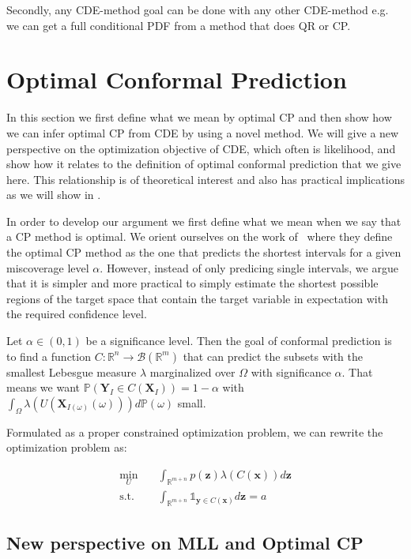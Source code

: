 Secondly, any CDE-method goal can be done with any other CDE-method e.g. we can get a full conditional PDF from a method that does QR or CP.

\section{Optimal Conformal Prediction}\label{sec:optimal_cp}

In this section we first define what we mean by optimal CP and then show how we can infer optimal CP from CDE by using a novel method. We will give a new perspective on the optimization objective of CDE, which often is likelihood, and show how it relates to the definition of optimal conformal prediction that we give here. This relationship is of theoretical interest and also has practical implications as we will show in . %

In order to develop our argument we first define what we mean when we say that a CP method is optimal. We orient ourselves on the work of~\cite{sesia2021conformal} where they define the optimal CP method as the one that predicts the shortest intervals for a given miscoverage level $\alpha$. However, instead of only predicing single intervals, we argue that it is simpler and more practical to simply estimate the shortest possible regions of the target space that contain the target variable in expectation with the required confidence level.

Let $\alpha \in (0,1)$ be a significance level. Then the goal of conformal prediction is to find a function $C : \mathbb{R}^n \to \mathcal{B}(\mathbb{R}^m)$ that can predict the subsets with the smallest Lebesgue measure $\lambda$ marginalized over $\Omega$ with significance $\alpha$. That means we want $\mathbb{P}(\mathbf{Y}_I \in C(\mathbf{X}_I)) = 1 - \alpha$ with $\int_{\Omega}\lambda(U(\mathbf{X}_{I(\omega)}(\omega))) d\mathbb{P}(\omega)$ small.

Formulated as a proper constrained optimization problem, we can rewrite the optimization problem as:

\begin{align}
    \min_U \quad      & \int_{\mathbb{R}^{m + n}} p(\mathbf{z})
    \lambda(C(\mathbf{x}))
    d\mathbf{z}
    \\
    \text{s.t.} \quad & \int_{\mathbb{R}^{m + n}} \mathds{1}_{\mathbf{y} \in
    C(\mathbf{x})} d\mathbf{z} = a
\end{align}

\subsection{New perspective on MLL and Optimal CP}\label{sec:optimal_cp_proofs}

